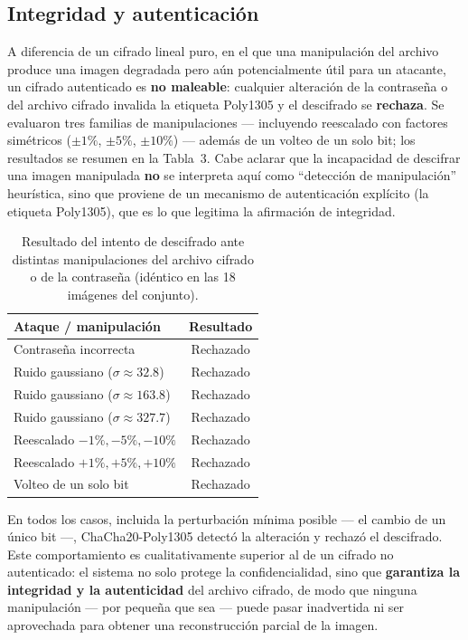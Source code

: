 \documentclass{llncs}
\begin{document}
\subsection{Integridad y autenticaci\'on}

A diferencia de un cifrado lineal puro, en el que una manipulaci\'on del
archivo produce una imagen degradada pero a\'un potencialmente \'util para
un atacante, un cifrado autenticado es \textbf{no maleable}: cualquier
alteraci\'on de la contrase\~na o del archivo cifrado invalida la etiqueta
Poly1305 y el descifrado se \textbf{rechaza}. Se evaluaron tres familias de
manipulaciones --- incluyendo reescalado con factores sim\'etricos
($\pm1\%$, $\pm5\%$, $\pm10\%$) --- adem\'as de un volteo de un solo bit; los
resultados se resumen en la Tabla~3. Cabe aclarar que la incapacidad de
descifrar una imagen manipulada \textbf{no} se interpreta aqu\'i como
``detecci\'on de manipulaci\'on'' heur\'istica, sino que proviene de un
mecanismo de autenticaci\'on expl\'icito (la etiqueta Poly1305), que es lo
que legitima la afirmaci\'on de integridad.

\begin{table}[htbp]
  \centering
  \caption{Resultado del intento de descifrado ante distintas
  manipulaciones del archivo cifrado o de la contrase\~na (id\'entico en las
  18 im\'agenes del conjunto).}
  \begin{tabular}{@{}lc@{}}
    \toprule
    \textbf{Ataque / manipulaci\'on} & \textbf{Resultado} \\
    \midrule
    Contrase\~na incorrecta                     & Rechazado \\
    Ruido gaussiano ($\sigma \approx 32.8$)      & Rechazado \\
    Ruido gaussiano ($\sigma \approx 163.8$)     & Rechazado \\
    Ruido gaussiano ($\sigma \approx 327.7$)     & Rechazado \\
    Reescalado $-1\%, -5\%, -10\%$               & Rechazado \\
    Reescalado $+1\%, +5\%, +10\%$               & Rechazado \\
    Volteo de un solo bit                        & Rechazado \\
    \bottomrule
  \end{tabular}
\end{table}
\FloatBarrier

En todos los casos, incluida la perturbaci\'on m\'inima posible --- el
cambio de un \'unico bit ---, ChaCha20-Poly1305 detect\'o la alteraci\'on y
rechaz\'o el descifrado. Este comportamiento es cualitativamente superior al
de un cifrado no autenticado: el sistema no solo protege la
confidencialidad, sino que \textbf{garantiza la integridad y la
autenticidad} del archivo cifrado, de modo que ninguna manipulaci\'on ---
por peque\~na que sea --- puede pasar inadvertida ni ser aprovechada para
obtener una reconstrucci\'on parcial de la imagen.
\end{document}
